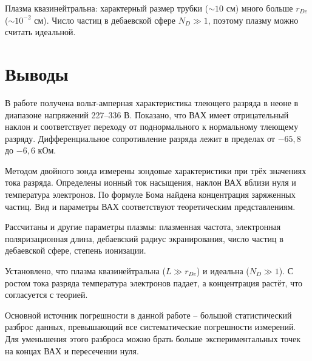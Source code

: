 \documentclass[12pt]{extarticle}
\begin{document}
			Плазма квазинейтральна: характерный размер трубки ($\sim10$ см) много больше $r_{De}$ ($\sim10^{-2}$ см). Число частиц в дебаевской сфере $N_D \gg 1$, поэтому плазму можно считать идеальной.
		
		
		


		
		
\section{Выводы}

	\hspace{4mm} В работе получена вольт-амперная характеристика тлеющего разряда в неоне в диапазоне напряжений 227--336 В. Показано, что ВАХ имеет отрицательный наклон и соответствует переходу от поднормального к нормальному тлеющему разряду. Дифференциальное сопротивление разряда лежит в пределах от $-65{,}8$ до $-6{,}6$ кОм.
	
	Методом двойного зонда измерены зондовые характеристики при трёх значениях тока разряда. Определены ионный ток насыщения, наклон ВАХ вблизи нуля и температура электронов. По формуле Бома найдена концентрация заряженных частиц. Вид и параметры ВАХ соответствуют теоретическим представлениям.
	
	Рассчитаны и другие параметры плазмы: плазменная частота, электронная поляризационная длина, дебаевский радиус экранирования, число частиц в дебаевской сфере, степень ионизации.
	
	Установлено, что плазма квазинейтральна ($L \gg r_{De}$) и идеальна ($N_D \gg 1$). С ростом тока разряда температура электронов падает, а концентрация растёт, что согласуется с теорией.
	
	Основной источник погрешности  в данной работе -- большой статистический разброс данных, превышающий все систематические погрешности измерений. Для уменьшения этого разброса можно брать больше экспериментальных точек на концах ВАХ и пересечении нуля.
\end{document}

